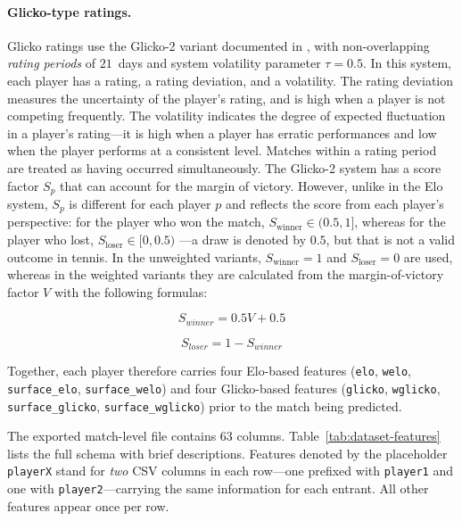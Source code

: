 \paragraph{Glicko-type ratings.}
Glicko ratings use the Glicko-2 variant documented in \textcite{glickman_2022}, with non-overlapping
\emph{rating periods} of $21$~days and system volatility parameter $\tau = 0.5$. In this system,
each player has a rating, a rating deviation, and a volatility. The rating deviation measures the
uncertainty of the player's rating, and is high when a player is not competing frequently. The
volatility indicates the degree of expected fluctuation in a player's rating---it is high when a
player has erratic performances and low when the player performs at a consistent level. Matches
within a rating period are treated as having occurred simultaneously. The Glicko-2 system has a
score factor $S_p$ that can account for the margin of victory. However, unlike in the Elo system,
$S_p$ is different for each player $p$ and reflects the score from each player's perspective: for
the player who won the match, $S_{\mathrm{winner}} \in (0.5, 1]$, whereas for the player who lost,
$S_{\mathrm{loser}} \in [0, 0.5)$ ---a draw is denoted by $0.5$, but that is not a valid outcome in
tennis. In the unweighted variants, $S_{\mathrm{winner}} = 1$ and $S_{\mathrm{loser}} = 0$ are used,
whereas
in the weighted variants they are calculated from the margin-of-victory factor $V$ with the
following formulas:

\begin{equation}
  S_{winner} = 0.5 V + 0.5
  \label{eq:glicko-score-winner}
\end{equation}

\begin{equation}
  S_{loser} = 1 - S_{winner}
  \label{eq:glicko-score-loser}
\end{equation}

Together, each player therefore carries four Elo-based features (\texttt{elo}, \texttt{welo},
\texttt{surface\_elo}, \texttt{surface\_welo}) and four Glicko-based features (\texttt{glicko},
\texttt{wglicko}, \texttt{surface\_glicko}, \texttt{surface\_wglicko}) prior to the match being
predicted.

The exported match-level file contains 63 columns. Table~\ref{tab:dataset-features} lists the full
schema with brief descriptions. Features denoted by the placeholder \texttt{playerX} stand for
\emph{two} CSV columns in each row---one prefixed with \texttt{player1} and one with
\texttt{player2}---carrying the same information for each entrant. All other features appear once
per row.

